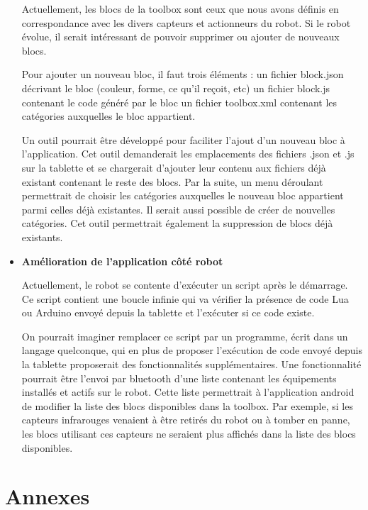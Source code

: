\documentclass[12pt,francais]{report}
\begin{document}
\begin{itemize}
Actuellement, les blocs de la toolbox sont ceux que nous avons définis en correspondance avec les divers capteurs et actionneurs du robot. Si le robot évolue, il serait intéressant de pouvoir supprimer ou ajouter de nouveaux blocs. 

Pour ajouter un nouveau bloc, il faut trois éléments :
un fichier block.json décrivant le bloc (couleur, forme, ce qu'il reçoit, etc)
un fichier block.js contenant le code généré par le bloc
un fichier toolbox.xml contenant les catégories auxquelles le bloc appartient.

Un outil pourrait être développé pour faciliter l'ajout d'un nouveau bloc à l'application. Cet outil demanderait les emplacements des fichiers .json et .js sur la tablette et se chargerait d'ajouter leur contenu aux fichiers déjà existant contenant le reste des blocs. Par la suite, un menu déroulant permettrait de choisir les catégories auxquelles le nouveau bloc appartient parmi celles déjà existantes. Il serait aussi possible de créer de nouvelles catégories. Cet outil permettrait également la suppression de blocs déjà existants.

\bigskip
\item \textbf{Amélioration de l'application côté robot}

Actuellement, le robot se contente d'exécuter un script après le démarrage. Ce script contient une boucle infinie qui va vérifier la présence de code Lua ou Arduino envoyé depuis la tablette et l'exécuter si ce code existe.

On pourrait imaginer remplacer ce script par un programme, écrit dans un langage quelconque, qui en plus de proposer l'exécution de code envoyé depuis la tablette proposerait des fonctionnalités supplémentaires. Une fonctionnalité pourrait être l'envoi par bluetooth d'une liste contenant les équipements installés et actifs sur le robot. Cette liste permettrait à l'application android de modifier la liste des blocs disponibles dans la toolbox. Par exemple, si les capteurs infrarouges venaient à être retirés du robot ou à tomber en panne, les blocs utilisant ces capteurs ne seraient plus affichés dans la liste des blocs disponibles.

\end{itemize}






\chapter*{Annexes}
\end{document}
